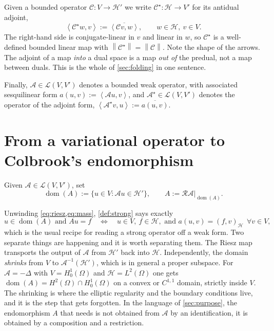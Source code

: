 \documentclass[11pt,a4paper]{article}
\theoremstyle{plain}
\newcommand{\norm}[1]{\left\|#1\right\|}
\newcommand{\dual}[2]{\left\langle #1, #2 \right\rangle}
\newcommand{\Hb}{\mathcal{H}}
\newcommand{\Vb}{V}
\newcommand{\Aop}{\mathcal{A}}
\DeclareMathOperator{\dom}{dom}
\newcommand{\adj}{\star}                 %
\newcommand{\Riesz}{\mathcal{R}}         %
\begin{document}
Given a bounded operator $\mathcal{C} \colon \Vb \to \Hb'$ we write
$\mathcal{C}^{\adj} \colon \Hb \to \Vb'$ for its antidual adjoint,
\begin{equation}
  \label{eq:antidualadjoint}
  \dual{\mathcal{C}^{\adj} w}{v} := \overline{\dual{\mathcal{C}v}{w}},
  \qquad w \in \Hb,\ v \in \Vb.
\end{equation}
The right-hand side is conjugate-linear in $v$ and linear in $w$, so
$\mathcal{C}^{\adj}$ is a well-defined bounded linear map with
$\norm{\mathcal{C}^{\adj}} = \norm{\mathcal{C}}$.  Note the shape of the
arrows.  The adjoint of a map \emph{into} a dual space is a map \emph{out of}
the predual, not a map between duals.  This is the whole of \cref{sec:folding}
in one sentence.

Finally, $\Aop \in \mathcal{L}(\Vb,\Vb')$ denotes a bounded weak operator, with
associated sesquilinear form $a(u,v) := \dual{\Aop u}{v}$, and $\Aop^{\adj} \in
\mathcal{L}(\Vb,\Vb')$ denotes the operator of the adjoint form,
$\dual{\Aop^{\adj} v}{u} := \overline{a(u,v)}$.

\section{From a variational operator to Colbrook's endomorphism}
\label{sec:bridge}

\begin{definition}
  \label{def:strong}
  Given $\Aop \in \mathcal{L}(\Vb,\Vb')$, set
  \begin{equation}
    \label{eq:domA}
    \dom(A) := \{u \in \Vb : \Aop u \in \Hb'\},
    \qquad A := \Riesz \Aop \big|_{\dom(A)} .
  \end{equation}
\end{definition}

Unwinding \cref{eq:riesz,eq:mass}, \cref{def:strong} says exactly
\begin{equation}
  \label{eq:strongchar}
  u \in \dom(A) \text{ and } Au = f
  \quad \Longleftrightarrow \quad
  u \in \Vb,\ f \in \Hb, \text{ and } a(u,v) = (f,v)_{\Hb}
  \ \ \forall v \in \Vb ,
\end{equation}
which is the usual recipe for reading a strong operator off a weak form.  Two
separate things are happening and it is worth separating them.  The Riesz map
transports the output of $\Aop$ from $\Hb'$ back into $\Hb$.  Independently, the
domain \emph{shrinks} from $\Vb$ to $\Aop^{-1}(\Hb')$, which is in general a
proper subspace.  For $\Aop = -\Delta$ with $\Vb = H^1_0(\Omega)$ and $\Hb =
L^2(\Omega)$ one gets $\dom(A) = H^2(\Omega) \cap H^1_0(\Omega)$ on a convex or
$C^{1,1}$ domain, strictly inside $\Vb$.  The shrinking is where the elliptic
regularity and the boundary conditions live, and it is the step that gets
forgotten.  In the language of \cref{sec:purpose}, the endomorphism $A$ that
\cite{Colbrook2026} needs is not obtained from $\Aop$ by an identification, it
is obtained by a composition and a restriction.
\end{document}
